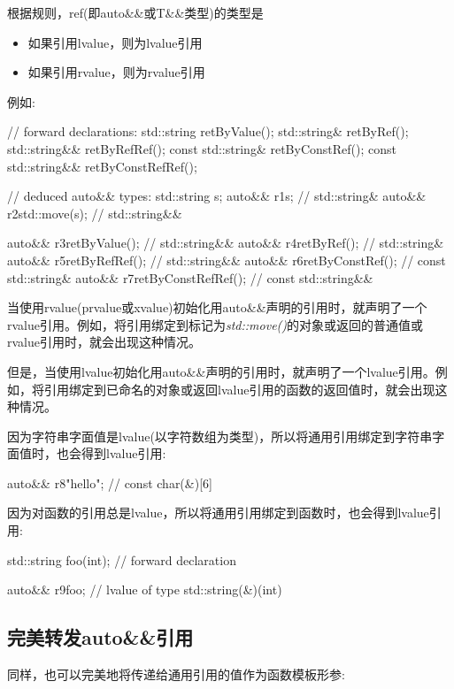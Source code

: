 根据规则，ref(即auto\&\&或T\&\&类型)的类型是

\begin{itemize}
	\item 如果引用lvalue，则为lvalue引用
	\item 如果引用rvalue，则为rvalue引用
\end{itemize}

例如:

\begin{cppcode}
// forward declarations:
std::string retByValue();
std::string& retByRef();
std::string&& retByRefRef();
const std::string& retByConstRef();
const std::string&& retByConstRefRef();

// deduced auto&& types:
std::string s;
auto&& r1{s}; // std::string&
auto&& r2{std::move(s)}; // std::string&&

auto&& r3{retByValue()}; // std::string&&
auto&& r4{retByRef()}; // std::string&
auto&& r5{retByRefRef()}; // std::string&&
auto&& r6{retByConstRef()}; // const std::string&
auto&& r7{retByConstRefRef()}; // const std::string&&
\end{cppcode}

当使用rvalue(prvalue或xvalue)初始化用auto\&\&声明的引用时，就声明了一个rvalue引用。例如，将引用绑定到标记为\textit{std::move()}的对象或返回的普通值或rvalue引用时，就会出现这种情况。

但是，当使用lvalue初始化用auto\&\&声明的引用时，就声明了一个lvalue引用。例如，将引用绑定到已命名的对象或返回lvalue引用的函数的返回值时，就会出现这种情况。

因为字符串字面值是lvalue(以字符数组为类型)，所以将通用引用绑定到字符串字面值时，也会得到lvalue引用:

\begin{cppcode}
auto&& r8{"hello"}; // const char(&)[6]
\end{cppcode}

因为对函数的引用总是lvalue，所以将通用引用绑定到函数时，也会得到lvalue引用:

\begin{cppcode}
std::string foo(int); // forward declaration

auto&& r9{foo}; // lvalue of type std::string(&)(int)
\end{cppcode}

\subsection{完美转发auto\&\&引用}

同样，也可以完美地将传递给通用引用的值作为函数模板形参:

